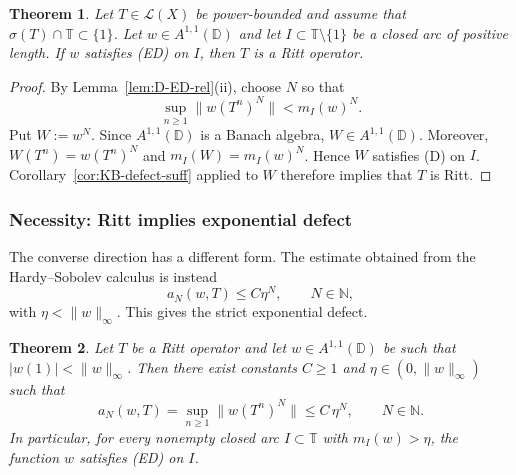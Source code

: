 \documentclass[11pt]{amsart}
\numberwithin{equation}{section}
\newtheorem{theorem}{Theorem}[section]
\theoremstyle{definition}
\theoremstyle{plain}
\def\N{\mathbb{N}}
\def\T{\mathbb{T}}
\def\L{L}
\def\D{\mathbb{D}}
\renewcommand{\L}{\mathcal L}
\begin{document}


\begin{theorem}\label{thm:KB-expdef-suff}
Let $T\in\L(X)$ be power-bounded and assume that $\sigma(T)\cap\T\subset\{1\}$.
Let $w\in A^{1,1}(\D)$ and let $I\subset\T\setminus\{1\}$ be a closed arc of positive length.
If $w$ satisfies \textup{(ED)} on $I$, then $T$ is a Ritt operator.
\end{theorem}

\begin{proof}
By Lemma~\ref{lem:D-ED-rel}(ii), choose $N$ so that
\[
  \sup_{n\ge1}\|w(T^n)^N\|<m_I(w)^N.
\]
Put $W:=w^N$.  Since $A^{1,1}(\D)$ is a Banach algebra,
$W\in A^{1,1}(\D)$.  Moreover, $W(T^n)=w(T^n)^N$ and
$m_I(W)=m_I(w)^N$.  Hence $W$ satisfies \textup{(D)} on $I$.  Corollary~\ref{cor:KB-defect-suff}
applied to $W$ therefore implies that $T$ is Ritt.
\end{proof}

\subsubsection{Necessity: Ritt implies exponential defect}


The converse direction has a different form. 
 The estimate
obtained from the Hardy--Sobolev calculus is instead
\[
        a_N(w,T)\le C\eta^N,\qquad N\in\mathbb N,
\]
with \(\eta<\|w\|_\infty\).  This gives the strict exponential defect.

\begin{theorem}\label{thm:Ritt-necessity-exp}
Let $T$ be a Ritt operator and let $w\in A^{1,1}(\D)$ be such that 
$|w(1)|<\|w\|_\infty$.
Then there exist constants $C\ge1$ and $\eta\in(0,\|w\|_\infty)$ such that
\[
   a_N(w,T)=\sup_{n\ge1}\|w(T^n)^N\| \le C\,\eta^N,\qquad N\in\N.
\]
In particular, for every nonempty closed arc $I\subset\T$ with $m_I(w)>\eta$, the
function $w$ satisfies \textup{(ED)} on $I$.
\end{theorem}
\end{document}
